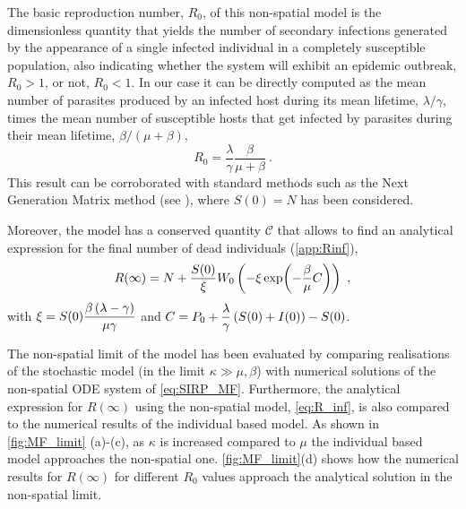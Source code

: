 The basic reproduction number, $R_0$, of this non-spatial model is the
dimensionless quantity that yields the number of secondary infections generated
by the appearance of a single infected individual in a completely susceptible
population, also indicating whether the system will exhibit an epidemic
outbreak, $R_0>1$, or not, $R_0<1$.
In our case it can be directly computed as the mean number of parasites
produced by an infected host during its mean lifetime, $\lambda/\gamma$, times
the mean number of susceptible hosts that get infected by parasites during
their mean lifetime, $\beta/(\mu+\beta)$,
\begin{equation}\label{eq:R0_MF}
    R_0=\frac{\lambda}{\gamma}\frac{\beta}{\mu+\beta} \ .
\end{equation}
This result can be corroborated with standard methods such as the Next
Generation Matrix method \cite{Diekmann2010} (see \cite{GimenezRomero2021}),
where $S(0)=N$ has been considered.

Moreover, the model has a conserved quantity $\mathcal{C}$
\cite{GimenezRomero2021} that allows to find an analytical expression for the
final number of dead individuals (\cref{app:Rinf}),
\begin{equation}\label{eq:R_inf}
    R(\infty)=N+\frac{S(0)}{\xi}W_0\left(-\xi\exp(-\frac{\beta}{\mu}C)\right) \
    ,
\end{equation}
with $\displaystyle\xi=S(0)\frac{\beta\left(\lambda-\gamma\right)}{\mu\gamma}$
and $\displaystyle C=P_0+\frac{\lambda}{\gamma}\left(S(0)+I(0)\right)-S(0)$.

The non-spatial limit of the model has been evaluated by comparing realisations
of the stochastic model (in the limit $\kappa\gg\mu,\beta$) with numerical
solutions of the non-spatial ODE system of \cref{eq:SIRP_MF}. Furthermore, the
analytical expression for $R(\infty)$ using the non-spatial model,
\cref{eq:R_inf}, is also compared to the numerical results of the individual
based model. As shown in \cref{fig:MF_limit} (a)-(c), as $\kappa$ is increased
compared to $\mu$ the individual based model approaches the non-spatial one.
\cref{fig:MF_limit}(d) shows how the numerical results for $R(\infty)$ for
different $R_0$ values approach the analytical solution in the non-spatial
limit.

